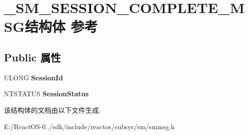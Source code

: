 \hypertarget{struct___s_m___s_e_s_s_i_o_n___c_o_m_p_l_e_t_e___m_s_g}{}\section{\+\_\+\+S\+M\+\_\+\+S\+E\+S\+S\+I\+O\+N\+\_\+\+C\+O\+M\+P\+L\+E\+T\+E\+\_\+\+M\+S\+G结构体 参考}
\label{struct___s_m___s_e_s_s_i_o_n___c_o_m_p_l_e_t_e___m_s_g}
\subsection*{Public 属性}
\begin{DoxyCompactItemize}
\item 
\mbox{\label{struct___s_m___s_e_s_s_i_o_n___c_o_m_p_l_e_t_e___m_s_g_ae39b4a94d19dfa2879096a1b03b5847f}} 
U\+L\+O\+NG {\bfseries Session\+Id}
\item 
\mbox{\label{struct___s_m___s_e_s_s_i_o_n___c_o_m_p_l_e_t_e___m_s_g_a4c6bc88b4a848a9403b2c11c779271ff}} 
N\+T\+S\+T\+A\+T\+US {\bfseries Session\+Status}
\end{DoxyCompactItemize}


该结构体的文档由以下文件生成\+:\begin{DoxyCompactItemize}
\item 
E\+:/\+React\+O\+S-\/0../sdk/include/reactos/subsys/sm/smmsg.\+h\end{DoxyCompactItemize}
